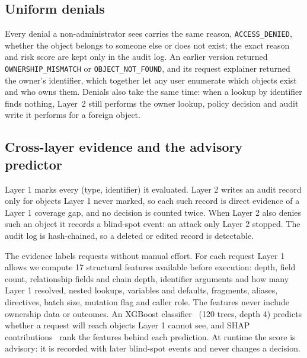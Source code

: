 \documentclass[conference]{IEEEtran}
\newcommand{\code}[1]{\texttt{\small #1}}
\begin{document}
\subsection{Uniform denials}
Every denial a non-administrator sees carries the same reason, \code{ACCESS\_DENIED}, whether the object belongs to someone else or does not exist; the exact reason and risk score are kept only in the audit log. An earlier version returned \code{OWNERSHIP\_MISMATCH} or \code{OBJECT\_NOT\_FOUND}, and its request explainer returned the owner's identifier, which together let any user enumerate which objects exist and who owns them. Denials also take the same time: when a lookup by identifier finds nothing, Layer~2 still performs the owner lookup, policy decision and audit write it performs for a foreign object.

\subsection{Cross-layer evidence and the advisory predictor}
Layer 1 marks every (type, identifier) it evaluated. Layer 2 writes an audit record only for objects Layer 1 never marked, so each such record is direct evidence of a Layer 1 coverage gap, and no decision is counted twice. When Layer 2 also denies such an object it records a blind-spot event: an attack only Layer 2 stopped. The audit log is hash-chained, so a deleted or edited record is detectable.

The evidence labels requests without manual effort. For each request Layer 1 allows we compute 17 structural features available before execution: depth, field count, relationship fields and chain depth, identifier arguments and how many Layer 1 resolved, nested lookups, variables and defaults, fragments, aliases, directives, batch size, mutation flag and caller role. The features never include ownership data or outcomes. An XGBoost classifier~\cite{xgboost} (120 trees, depth 4) predicts whether a request will reach objects Layer 1 cannot see, and SHAP contributions~\cite{shap} rank the features behind each prediction. At runtime the score is advisory: it is recorded with later blind-spot events and never changes a decision.
\end{document}
